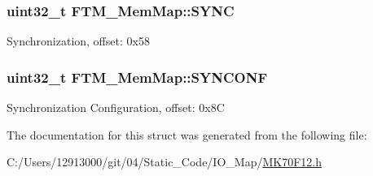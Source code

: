 \subsubsection[{S\+Y\+N\+C}]{\setlength{\rightskip}{0pt plus 5cm}uint32\+\_\+t F\+T\+M\+\_\+\+Mem\+Map\+::\+S\+Y\+N\+C}\label{struct_f_t_m___mem_map_a9537a55fae48de4811bfe7600d37b230}
Synchronization, offset\+: 0x58 \hypertarget{struct_f_t_m___mem_map_a3bd4b174127a80c7f8bd910b66e6de60}{}
\subsubsection[{S\+Y\+N\+C\+O\+N\+F}]{\setlength{\rightskip}{0pt plus 5cm}uint32\+\_\+t F\+T\+M\+\_\+\+Mem\+Map\+::\+S\+Y\+N\+C\+O\+N\+F}\label{struct_f_t_m___mem_map_a3bd4b174127a80c7f8bd910b66e6de60}
Synchronization Configuration, offset\+: 0x8\+C 

The documentation for this struct was generated from the following file\+:\begin{DoxyCompactItemize}
\item 
C\+:/\+Users/12913000/git/04/\+Static\+\_\+\+Code/\+I\+O\+\_\+\+Map/\hyperlink{_m_k70_f12_8h}{M\+K70\+F12.\+h}\end{DoxyCompactItemize}
